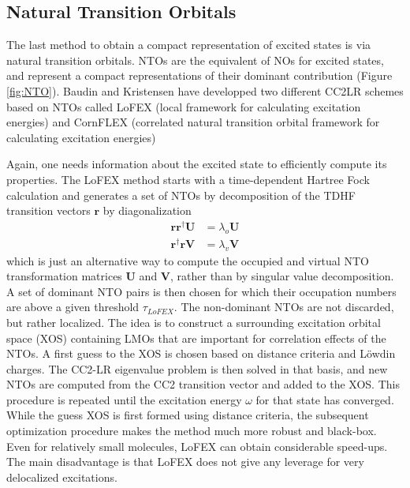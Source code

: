 
 
\subsection{Natural Transition Orbitals}

The last method to obtain a compact representation of excited states is via natural transition orbitals. NTOs are the equivalent of NOs for excited states, and represent a compact representations of their dominant contribution (Figure \ref{fig:NTO}). Baudin and Kristensen have developped two different CC2LR schemes based on NTOs called LoFEX (local framework for calculating excitation energies) \cite{Bau2016} and CornFLEX (correlated natural transition orbital framework for calculating excitation energies) \cite{Bau2017} 

Again, one needs information about the excited state to efficiently compute its properties. The LoFEX method starts with a time-dependent Hartree Fock calculation and generates a set of NTOs by decomposition of the TDHF transition vectors $\mathbf{r}$ by diagonalization
\begin{align}
\mathbf{r} \mathbf{r}^{\dagger} \mathbf{U} &= \lambda_o \mathbf{U} \\
\mathbf{r}^{\dagger} \mathbf{r} \mathbf{V} &= \lambda_v \mathbf{V}
\end{align}
\noindent which is just an alternative way to compute the occupied and virtual NTO transformation matrices $\mathbf{U}$ and $\mathbf{V}$, rather than by singular value decomposition. A set of dominant NTO pairs is then chosen for which their occupation numbers are above a given threshold $\tau_{LoFEX}$. The non-dominant NTOs are not discarded, but rather localized. The idea is to construct a surrounding excitation orbital space (XOS) containing LMOs that are important for correlation effects of the NTOs. A first guess to the XOS is chosen based on distance criteria and Löwdin charges. The CC2-LR eigenvalue problem is then solved in that basis, and new NTOs are computed from the CC2 transition vector and added to the XOS. This procedure is repeated until the excitation energy $\omega$ for that state has converged. While the guess XOS is first formed using distance criteria, the subsequent optimization procedure makes the method much more robust and black-box. Even for relatively small molecules, LoFEX can obtain considerable speed-ups. The main disadvantage is that LoFEX does not give any leverage for very delocalized excitations. 

